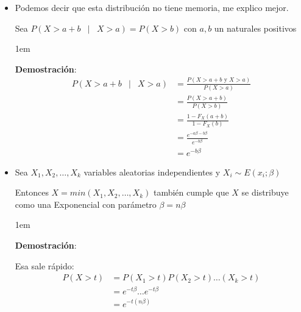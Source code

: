\documentclass[12pt, fleqn]{report}                             %
\newenvironment{SmallIndentation}[1][0.75em]                    %
        {\begin{adjustwidth}{#1}{}\begin{footnotesize}}             %
        {\end{footnotesize}\end{adjustwidth}}                       %
\DeclareMathOperator \Space {\quad}                             %
\DeclareMathOperator \MiniSpace {\;}                            %
\newcommand \Such {\MiniSpace | \MiniSpace}                     %
\theoremstyle{break}                                            %
\begin{document}
                \begin{itemize}
                    \item 
                        Podemos decir que esta distribución no tiene memoria, me explico
                        mejor.

                        Sea $P(X > a + b \Such X > a) = P(X > b)$ con $a, b$ un naturales positivos

                        \begin{SmallIndentation}[1em]
                            \textbf{Demostración}:
                            \begin{align*}
                                P(X > a + b \Such X > a)
                                    &= \frac{P(X > a + b \text{ y } X > a)}{P(X > a)}       \\  
                                    &= \frac{P(X > a + b)}{P(X > b)}                        \\
                                    &= \frac{1 - F_X(a+b)}{1 - F_X(b)}                      \\
                                    &= \frac{e^{-a\beta - b\beta}}{e^{-b\beta}}             \\
                                    &= e^{-b\beta}    
                            \end{align*}    
                        
                        \end{SmallIndentation}
                            
                    \item 
                        Sea $X_1, X_2, \dots, X_k$ variables aleatorias independientes
                        y $X_i \sim E(x_i; \beta)$ 

                        Entonces $X = min(X_1, X_2, \dots, X_k)$ también cumple que $X$ se distribuye como
                        una Exponencial con parámetro $\beta = n\beta$

                        \begin{SmallIndentation}[1em]
                            \textbf{Demostración}:

                            Esa sale rápido:
                            \begin{align*}
                                P(X > t)
                                    &= P(X_1 > t) P(X_2 > t) \dots (X_k > t)        \\
                                    &= e^{-t\beta} \dots e^{-t\beta}                \\
                                    &= e^{-t (n\beta)}
                            \end{align*}


\end{SmallIndentation}
\end{itemize}
\end{document}

